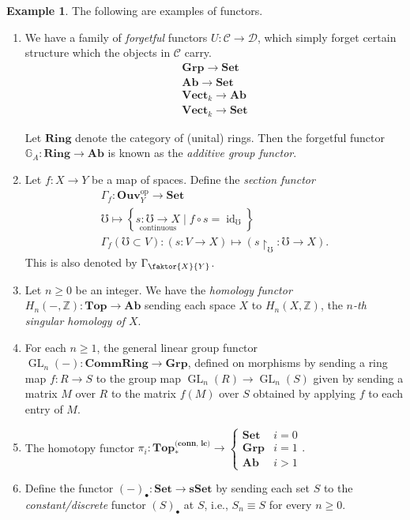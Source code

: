 \documentclass[10pt,letterpaper,cm]{nupset}
\theoremstyle{definition}
\newtheorem{exmp}[definition]{Example}
\theoremstyle{theorem}
\theoremstyle{remark}
\newcommand{\G}{\mathbb G}
\newcommand{\Z}{\mathbb Z}
\newcommand{\1}{\mathbf{1}}
\renewcommand{\c}{\mathscr{C}}
\renewcommand{\d}{\mathscr{D}}
\newcommand{\0}{\vec 0}
\DeclareMathOperator*{\GL}{GL}
\DeclareMathOperator{\id}{\mathrm{id}}
\DeclareMathOperator{\op}{op}
\begin{document}
\begin{exmp}  The following are examples of functors.
\begin{enumerate}
\item We have a family of \textit{forgetful} functors $U : \c \to \d$, which simply forget certain structure which the objects in $\c$ carry.
\begin{gather*}
\mathbf{Grp} \to \mathbf{Set}
\\ \mathbf{Ab} \to \mathbf{Set}
\\ \mathbf{Vect}_k \to \mathbf{Ab}
\\ \mathbf{Vect}_k \to \mathbf{Set}
\end{gather*} 

Let $\mathbf{Ring}$ denote the category of (unital) rings. Then the forgetful functor $\G_A: \mathbf{Ring} \to \mathbf{Ab}$ is known as the \textit{additive group functor}.
\item Let $f: X \to Y$ be a map of spaces. Define the \textit{section functor}
 \begin{gather*}
 \Gamma_f: \mathbf{Ouv}_Y^{\op} \to \mathbf{Set}
 \\
\mho \mapsto \left\{\underset{\text{continuous}}{s: \mho \to X} \mid f \circ s = \id_{\mho}\right\}
\\ \Gamma_f(\mho \subset V) : \left(s: V \to X\right) \mapsto \left(s\restriction_{\mho} : \mho \to X\right).
\end{gather*} This is also denoted by $\Gamma_{\faktor{X}{Y}}$.
\item Let $n\geq 0$ be an integer. We have the \textit{homology functor} $H_n(-, \Z) : \mathbf{Top} \to \mathbf{Ab}$ sending each space $X$ to $H_n(X, \Z)$, the \textit{$n$-th singular homology of $X$}.
\item For each $n\geq 1$, the general linear group functor $\GL_n(-) : \mathbf{CommRing} \to \mathbf{Grp}$, defined on morphisms by sending a ring map $f: R \to S$ to the group map $\GL_n(R) \to \GL_n(S)$ given by sending a matrix $M$ over $R$ to the matrix $f(M)$ over $S$ obtained by applying $f$ to each entry of $M$.
\item The homotopy functor $\pi_i : \mathbf{Top_{\ast}^{\text{(conn, lc)}}} \to
 \begin{cases} 
\mathbf{Set} & i=0
\\ \mathbf{Grp} & i = 1 \\
\mathbf{Ab} & i >1
\end{cases}.$
\item Define the functor  $(-)_{\bullet} : \mathbf{Set} \to {\mathbf{sSet}}$ by sending each set $S$ to the \textit{constant/discrete} functor $(S)_{\bullet}$ at $S$, i.e.,  $S_n \equiv S$ for every $n\geq 0$.


\end{enumerate}
\end{exmp}
\end{document}
